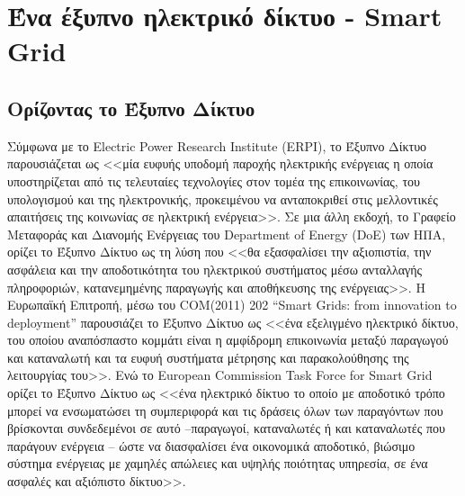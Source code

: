 \documentclass[12pt, a4paper, oneside]{report}
\begin{document}
\section{Ένα έξυπνο ηλεκτρικό δίκτυο - Smart Grid}

\subsection{Ορίζοντας το Έξυπνο Δίκτυο}

Σύμφωνα με το Electric Power Research Institute (ERPI), το Έξυπνο Δίκτυο παρουσιάζεται ως <<μία ευφυής υποδομή παροχής ηλεκτρικής ενέργειας η οποία υποστηρίζεται από τις τελευταίες τεχνολογίες στον τομέα της επικοινωνίας, του υπολογισμού και της ηλεκτρονικής, προκειμένου να ανταποκριθεί στις μελλοντικές απαιτήσεις της κοινωνίας σε ηλεκτρική ενέργεια>>. Σε μια άλλη εκδοχή, το Γραφείο Μεταφοράς και Διανομής Ενέργειας του Department of Energy (DoE) των ΗΠΑ, ορίζει το Έξυπνο Δίκτυο ως τη λύση που <<θα εξασφαλίσει την αξιοπιστία, την ασφάλεια και την αποδοτικότητα του ηλεκτρικού συστήματος μέσω ανταλλαγής πληροφοριών, κατανεμημένης παραγωγής και αποθήκευσης της ενέργειας>>. Η Ευρωπαϊκή Επιτροπή, μέσω του COM(2011) 202 ``Smart Grids: from innovation to deployment'' \cite{16} παρουσιάζει το Έξυπνο Δίκτυο ως <<ένα εξελιγμένο ηλεκτρικό δίκτυο, του οποίου αναπόσπαστο κομμάτι είναι η αμφίδρομη επικοινωνία μεταξύ παραγωγού και καταναλωτή και τα ευφυή συστήματα μέτρησης και παρακολούθησης της λειτουργίας του>>. Ενώ το European Commission Task Force for Smart Grid \cite{17} ορίζει το Έξυπνο Δίκτυο ως <<ένα ηλεκτρικό δίκτυο το οποίο με αποδοτικό τρόπο μπορεί να ενσωματώσει τη συμπεριφορά και τις δράσεις όλων των παραγόντων που βρίσκονται συνδεδεμένοι σε αυτό –παραγωγοί, καταναλωτές ή και καταναλωτές που παράγουν ενέργεια – ώστε να διασφαλίσει ένα οικονομικά αποδοτικό, βιώσιμο σύστημα ενέργειας με χαμηλές απώλειες και υψηλής ποιότητας υπηρεσία, σε ένα ασφαλές και αξιόπιστο δίκτυο>>.
\end{document}
